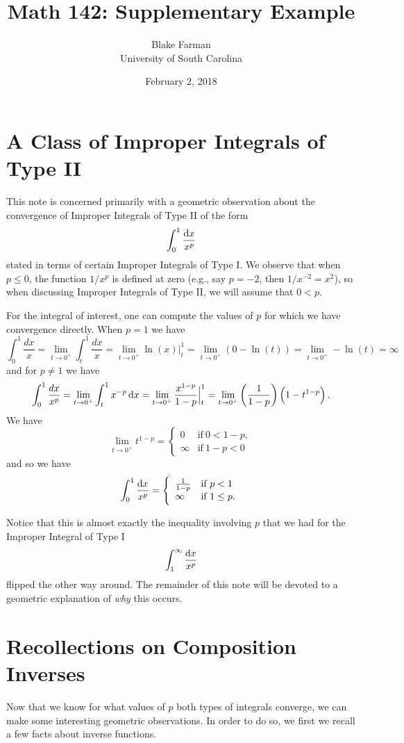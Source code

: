 \documentclass[reqno, 12pt]{amsart}
\title[Supplementary Example]{Math 142: Supplementary Example}
\author[Blake Farman]{Blake Farman\\University of South Carolina}
\date{February 2, 2018}
\begin{document}
\maketitle

\section{A Class of Improper Integrals of Type II}
This note is concerned primarily with a geometric observation about the convergence of Improper Integrals of Type II of the form
\[\int_0^1 \frac{\dif x}{x^p}\]
stated in terms of certain Improper Integrals of Type I.
We observe that when \(p \leq 0\), the function \(1/x^p\) is defined at zero (e.g., say \(p = -2\), then \(1/x^{-2} = x^2\)), so when discussing Improper Integrals of Type II, we will assume that \(0 < p\).

  For the integral of interest, one can compute the values of \(p\) for which we have convergence directly.
  When \(p = 1\) we have
  \[\int_0^1 \frac{dx}{x} = \lim_{t \to 0^+} \int_t^1 \frac{dx}{x} = \lim_{t \to 0^+} \ln(x)\Big|_t^1 = \lim_{t \to 0^+} (0 - \ln(t)) = \lim_{t \to 0^+} -\ln(t) = \infty\]
  and for \(p \neq 1\) we have
  \[\int_0^1 \frac{dx}{x^p} = \lim_{t \to 0^+} \int_t^1 x^{-p}\dif x = \lim_{t \to 0^+} \frac{x^{1 - p}}{1 - p}\Big|_t^1 = \lim_{t \to 0^+}\left(\frac{1}{1 - p}\right)\left(1 - t^{1- p}\right).\]
  We have 
  \[\lim_{t \to 0^+} t^{1 - p} = \left\{\begin{array}{ll}0 &\text{if}\ 0 < 1 - p,\\
  \infty & \text{if}\ 1 - p < 0\end{array} \right.\]
  and so we have
  \[\int_0^1 \frac{\dif x}{x^p} = \left\{\begin{array}{ll}\frac{1}{1 - p} & \text{if}\ p < 1\\ \infty & \text{if}\ 1 \leq p.\end{array}\right.\]

  \begin{remark}
    Notice that this is almost exactly the inequality involving \(p\) that we had for the Improper Integral of Type I
    \[\int_1^\infty \frac{\dif x}{x^p}\]
    flipped the other way around.
    The remainder of this note will be devoted to a geometric explanation of \textit{why} this occurs.
  \end{remark}
  \section{Recollections on Composition Inverses}
  Now that we know for what values of \(p\) both types of integrals converge, we can make some interesting geometric observations.
  In order to do so, we first we recall a few facts about inverse functions.
\end{document}
